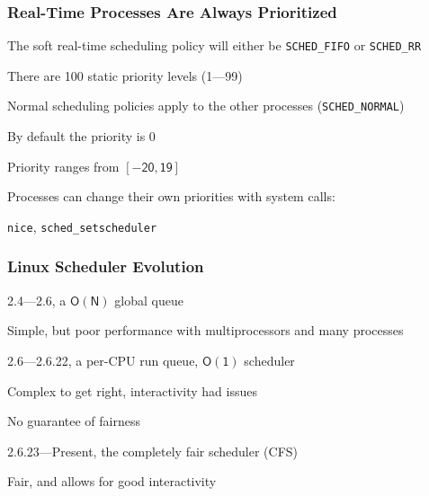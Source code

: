   \begin{frame}
    \frametitle{Real-Time Processes Are Always Prioritized}

    The soft real-time scheduling policy will either be \texttt{SCHED\_FIFO}
    or \texttt{SCHED\_RR}

    \hspace{2em} There are 100 static priority levels (1---99)

    \vspace{2em}

    Normal scheduling policies apply to the other processes
    (\texttt{SCHED\_NORMAL})

    \hspace{2em} By default the priority is 0

    \hspace{2em} Priority ranges from $\mathsf{[-20, 19]}$

    \hspace{2em}

    Processes can change their own priorities with system calls:

    \hspace{2em} \texttt{nice}, \texttt{sched\_setscheduler}
  \end{frame}

  \begin{frame}
    \frametitle{Linux Scheduler Evolution}

    2.4---2.6, a $\mathsf{O(N)}$ global queue

    \hspace{2em} Simple, but poor performance with multiprocessors and many processes

    \vspace{2em}

    2.6---2.6.22, a per-CPU run queue, $\mathsf{O(1)}$ scheduler

    \hspace{2em} Complex to get right, interactivity had issues

    \hspace{2em} No guarantee of fairness

    \vspace{2em}

    2.6.23---Present, the completely fair scheduler (CFS)

    \hspace{2em} Fair, and allows for good interactivity
  \end{frame}


